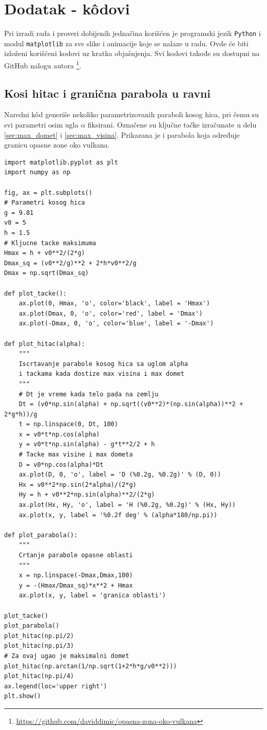 \documentclass[a4paper]{article}
\begin{document}
\appendix
 


\appendix
\section{Dodatak - k\^{o}dovi}
\label{sec:Dodatak}
Pri izradi rada i proveri dobijenih jednačina korišćen je programski jezik 
\verb|Python| i modul \verb|matplotlib|
za sve slike i animacije koje se nalaze u radu. 
Ovde će biti izloženi korišćeni kodovi uz kratka objašnjenja. 
Svi kodovi takođe su dostupni na GitHub nalogu autora 
\footnote{\url{https://github.com/daviddimic/opasna-zona-oko-vulkana}}.

\subsection{Kosi hitac i granična parabola u ravni}
\label{kod:2D_oblast}
Naredni k\^od generiše nekoliko parametrizovanih paraboli kosog hica, pri čemu
su svi parametri osim ugla $\alpha$ fiksirani. Označene su ključne tačke
izračunate u delu \ref{sec:max_domet} i \ref{sec:max_visina}. Prikazana je i
parabola koja određuje granicu opasne zone oko vulkana.
\begin{verbatim}
import matplotlib.pyplot as plt
import numpy as np

fig, ax = plt.subplots()
# Parametri kosog hica
g = 9.81
v0 = 5
h = 1.5
# Kljucne tacke maksimuma
Hmax = h + v0**2/(2*g)
Dmax_sq = (v0**2/g)**2 + 2*h*v0**2/g
Dmax = np.sqrt(Dmax_sq)

def plot_tacke():
    ax.plot(0, Hmax, 'o', color='black', label = 'Hmax')
    ax.plot(Dmax, 0, 'o', color='red', label = 'Dmax')
    ax.plot(-Dmax, 0, 'o', color='blue', label = '-Dmax')

def plot_hitac(alpha):
    """
    Iscrtavanje parabole kosog hica sa uglom alpha
    i tackama kada dostize max visina i max domet
    """
    # Dt je vreme kada telo pada na zemlju
    Dt = (v0*np.sin(alpha) + np.sqrt((v0**2)*(np.sin(alpha))**2 + 2*g*h))/g
    t = np.linspace(0, Dt, 100)
    x = v0*t*np.cos(alpha)
    y = v0*t*np.sin(alpha) - g*t**2/2 + h
    # Tacke max visine i max dometa
    D = v0*np.cos(alpha)*Dt
    ax.plot(D, 0, 'o', label = 'D (%0.2g, %0.2g)' % (D, 0))
    Hx = v0**2*np.sin(2*alpha)/(2*g)
    Hy = h + v0**2*np.sin(alpha)**2/(2*g)
    ax.plot(Hx, Hy, 'o', label = 'H (%0.2g, %0.2g)' % (Hx, Hy))
    ax.plot(x, y, label = '%0.2f deg' % (alpha*180/np.pi))

def plot_parabola():
    """
    Crtanje parabole opasne oblasti
    """
    x = np.linspace(-Dmax,Dmax,100)
    y = -(Hmax/Dmax_sq)*x**2 + Hmax
    ax.plot(x, y, label = 'granica oblasti')

plot_tacke()
plot_parabola()
plot_hitac(np.pi/2)
plot_hitac(np.pi/3)
# Za ovaj ugao je maksimalni domet
plot_hitac(np.arctan(1/np.sqrt(1+2*h*g/v0**2)))
plot_hitac(np.pi/4)
ax.legend(loc='upper right')
plt.show()
\end{verbatim}
\end{document}
